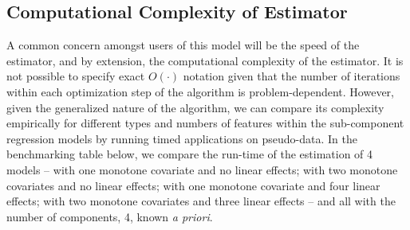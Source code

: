 \documentclass[10pt]{olplainarticle}\usepackage[]{graphicx}\usepackage[]{color}
\begin{document}



\subsection{Computational Complexity of Estimator} \label{seccomplex}

A common concern amongst users of this model will be the speed of the estimator, and by extension, the computational complexity of the estimator. It is not possible to specify exact $O(\cdot)$ notation given that the number of iterations within each optimization step of the algorithm is problem-dependent. However, given the generalized nature of the algorithm, we can compare its complexity empirically for different types and numbers of features within the sub-component regression models by running timed applications on pseudo-data. In the benchmarking table below, we compare the run-time of the estimation of 4 models -- with one monotone covariate and no linear effects; with two monotone covariates and no linear effects; with one monotone covariate and four linear effects; with two monotone covariates and three linear effects -- and all with the number of components, 4, known \emph{a priori}.

\end{document}

